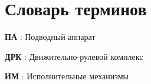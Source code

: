 \chapter*{Словарь терминов}             %

\textbf{ПА} : Подводный аппарат

\textbf{ДРК} : Движительно-рулевой комплекс

\textbf{ИМ} : Исполнительные механизмы